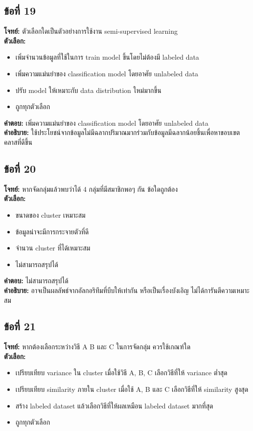 \documentclass[12pt]{article}
\begin{document}
\subsection*{ข้อที่ 19}
\textbf{โจทย์:} ตัวเลือกใดเป็นตัวอย่างการใช้งาน semi-supervised learning\\
\textbf{ตัวเลือก:}
\begin{itemize}
    \item เพิ่มจำนวนข้อมูลที่ใช้ในการ train model ขึ้นโดยไม่ต้องมี labeled data
    \item เพิ่มความแม่นยำของ classification model โดยอาศัย unlabeled data
    \item ปรับ model ให้เหมาะกับ data distribution ใหม่มากขึ้น
    \item ถูกทุกตัวเลือก
\end{itemize}

\textbf{คำตอบ:} เพิ่มความแม่นยำของ classification model โดยอาศัย unlabeled data\\
\textbf{คำอธิบาย:} ใช้ประโยชน์จากข้อมูลไม่มีฉลากปริมาณมากร่วมกับข้อมูลมีฉลากน้อยชิ้นเพื่อหาขอบเขตคลาสที่ดีขึ้น

\subsection*{ข้อที่ 20}
\textbf{โจทย์:} หากจัดกลุ่มแล้วพบว่าได้ 4 กลุ่มที่มีสมาชิกพอๆ กัน ข้อใดถูกต้อง\\
\textbf{ตัวเลือก:}
\begin{itemize}
    \item ขนาดของ cluster เหมาะสม
    \item ข้อมูลน่าจะมีการกระจายตัวที่ดี
    \item จำนวน cluster ที่ได้เหมาะสม
    \item ไม่สามารถสรุปได้
\end{itemize}

\textbf{คำตอบ:} ไม่สามารถสรุปได้\\
\textbf{คำอธิบาย:} อาจเป็นผลลัพธ์จากอัลกอริทึมที่บีบให้เท่ากัน หรือเป็นเรื่องบังเอิญ ไม่ได้การันตีความเหมาะสม

\subsection*{ข้อที่ 21}
\textbf{โจทย์:} หากต้องเลือกระหว่างวิธี A B และ C ในการจัดกลุ่ม ควรใช้เกณฑ์ใด\\
\textbf{ตัวเลือก:}
\begin{itemize}
    \item เปรียบเทียบ variance ใน cluster เมื่อใช้วิธี A, B, C เลือกวิธีที่ให้ variance ต่ำสุด
    \item เปรียบเทียบ similarity ภายใน cluster เมื่อใช้ A, B และ C เลือกวิธีที่ให้ similarity สูงสุด
    \item สร้าง labeled dataset แล้วเลือกวิธีที่ให้ผลเหมือน labeled dataset มากที่สุด
    \item ถูกทุกตัวเลือก
\end{itemize}
\end{document}
